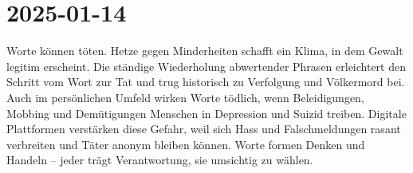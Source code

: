 \section{2025-01-14}


Worte können töten. Hetze gegen Minderheiten schafft ein Klima, in dem Gewalt legitim erscheint. Die ständige Wiederholung abwertender Phrasen erleichtert den Schritt vom Wort zur Tat und trug historisch zu Verfolgung und Völkermord bei. Auch im persönlichen Umfeld wirken Worte tödlich, wenn Beleidigungen, Mobbing und Demütigungen Menschen in Depression und Suizid treiben. Digitale Plattformen verstärken diese Gefahr, weil sich Hass und Falschmeldungen rasant verbreiten und Täter anonym bleiben können. Worte formen Denken und Handeln – jeder trägt Verantwortung, sie umsichtig zu wählen.
